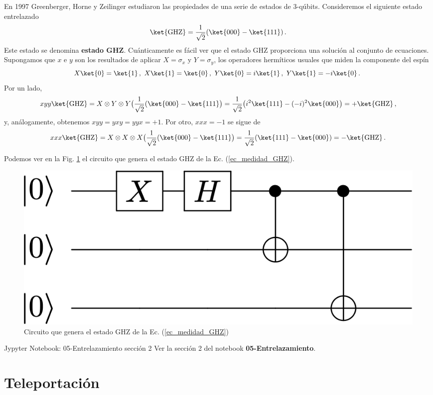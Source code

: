 \documentclass[a4paper,11pt]{book} %
\numberwithin{equation}{chapter}
\begin{document}
En 1997 Greenberger, Horne y Zeilinger estudiaron las propiedades de una serie de estados de 3-qúbits.   Consideremos el siguiente estado entrelazado
	\begin{equation} \label{ec_medidad_GHZ}
	\ket{\rm GHZ} = \frac{1}{\sqrt{2}}( \ket{000} - \ket{111} )\, . 
	\end{equation}
Este estado se denomina \textbf{estado GHZ}. Cuánticamente es fácil ver que el estado GHZ proporciona una solución al conjunto de ecuaciones. Supongamos que  $x$ e $y$ son los resultados de aplicar $X = \sigma_x$ y $Y = \sigma_y$, los operadores hermíticos  usuales que miden la componente del espín
$$
X \ket{0} = \ket{1}\, , ~ X \ket{1} = \ket{0}\, , ~ Y \ket{0} = i \ket{1}\, , ~ Y \ket{1} = -i \ket{0}\, . ~ 
$$
Por un lado, 
$$xyy\ket{{\rm GHZ}}  = X \otimes Y\otimes Y \big(\frac{1}{\sqrt{2}}(\ket{000}-\ket{111}\big) = \frac{1}{\sqrt{2}} \big(i^2 \ket{111}- (-i)^2
\ket{000}\big) = +  \ket{{\rm GHZ}}\, ,$$
y, análogamente, obtenemos $xyy=yxy=yyx= +1$. Por otro, $xxx=-1$ se sigue de
$$  
xxx  \ket{{\rm GHZ}} =   X \otimes X \otimes X \big(\frac{1}{\sqrt{2}}(\ket{000}-\ket{111}\big) =
\frac{1}{\sqrt{2}}(\ket{111}-\ket{000}) =  - \ket{\rm GHZ}\, .
$$

Podemos ver en la Fig. \ref{Fig_entrelazamiento_GHZ} el circuito que genera el estado GHZ de la Ec. (\ref{ec_medidad_GHZ}). 

	\begin{figure}[H]
	\centering 
	\includegraphics[width=0.4\linewidth]{Figuras/Fig_entrelazamiento_GHZ}
	\caption{Circuito que genera el estado GHZ de la Ec. (\ref{ec_medidad_GHZ})}
	\label{Fig_entrelazamiento_GHZ}
	\end{figure}


	\begin{mybox_orange}{Jypyter Notebook: 05-Entrelazamiento sección 2}
	Ver la sección 2 del notebook \textbf{05-Entrelazamiento}.
	\end{mybox_orange}



    \section{Teleportación}
\end{document}
